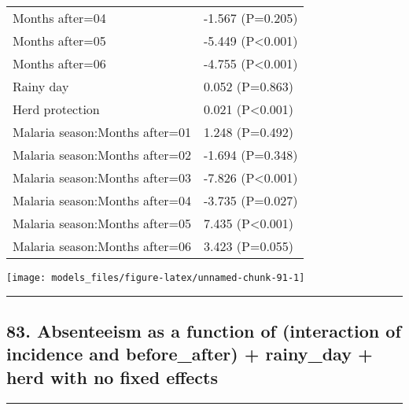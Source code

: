 \documentclass[]{article}
\begin{document}
\begin{longtable}[t]{ll}
\hspace{1em}Months after=04 & -1.567 (P=0.205)\\
\hspace{1em}Months after=05 & -5.449 (P<0.001)\\
\hspace{1em}Months after=06 & -4.755 (P<0.001)\\
\hspace{1em}Rainy day & 0.052 (P=0.863)\\
\hspace{1em}Herd protection & 0.021 (P<0.001)\\
\hspace{1em}Malaria season:Months after=01 & 1.248 (P=0.492)\\
\hspace{1em}Malaria season:Months after=02 & -1.694 (P=0.348)\\
\hspace{1em}Malaria season:Months after=03 & -7.826 (P<0.001)\\
\hspace{1em}Malaria season:Months after=04 & -3.735 (P=0.027)\\
\hspace{1em}Malaria season:Months after=05 & 7.435 (P<0.001)\\
\hspace{1em}Malaria season:Months after=06 & 3.423 (P=0.055)\\*
\end{longtable}

\begin{center}\texttt{[image: models\_files/figure-latex/unnamed-chunk-91-1]} \end{center}

\newpage

\begin{center}\rule{0.5\linewidth}{\linethickness}\end{center}

\subsection{83. Absenteeism as a function of (interaction of incidence
and before\_after) + rainy\_day + herd with no fixed
effects}\label{absenteeism-as-a-function-of-interaction-of-incidence-and-before_after-rainy_day-herd-with-no-fixed-effects}

\begin{center}\rule{0.5\linewidth}{\linethickness}\end{center}
\end{document}
